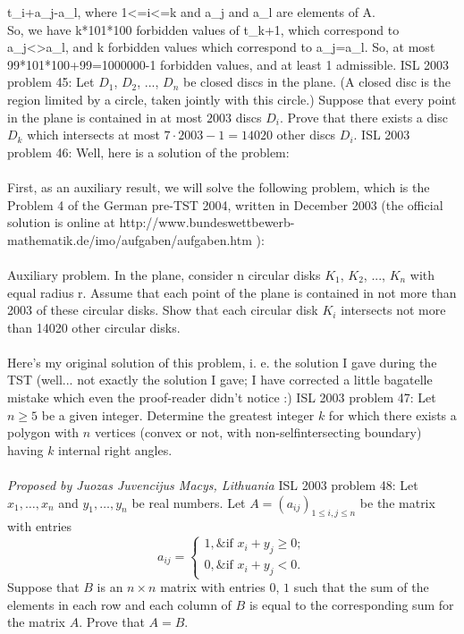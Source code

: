 t_i+a_j-a_l, where 1<=i<=k and a_j and a_l are elements of A. \\
So, we have k*101*100 forbidden values of t_{k+1}, which correspond to a_j<>a_l, and k forbidden values which correspond to a_j=a_l. So, at most 99*101*100+99=1000000-1 forbidden values, and at least 1 admissible. 
ISL 2003 problem 45:  Let $D_1$, $D_2$, ..., $D_n$ be closed discs in the plane. (A closed disc is the region limited by a circle, taken jointly with this circle.) Suppose that every point in the plane is contained in at most $2003$ discs $D_i$. Prove that there exists a disc $D_k$ which intersects at most $7\cdot 2003 - 1 = 14020$ other discs $D_i$. 
ISL 2003 problem 46:  Well, here is a solution of the problem: \\\\
First, as an auxiliary result, we will solve the following problem, which is the Problem 4 of the German pre-TST 2004, written in December 2003 (the official solution is online at http://www.bundeswettbewerb-mathematik.de/imo/aufgaben/aufgaben.htm ): \\\\
Auxiliary problem. In the plane, consider n circular disks $ K_1 $, $ K_2 $, ..., $ K_n $ with equal radius r. Assume that each point of the plane is contained in not more than 2003 of these circular disks. Show that each circular disk $ K_i $ intersects not more than 14020 other circular disks. \\\\
Here's my original solution of this problem, i. e. the solution I gave during the TST (well... not exactly the solution I gave; I have corrected a little bagatelle mistake which even the proof-reader didn't notice :) 
ISL 2003 problem 47:  Let $n \geq 5$ be a given integer.  Determine the greatest integer $k$ for which there exists a polygon with $n$ vertices (convex or not, with non-selfintersecting boundary) having $k$ internal right angles. \\\\
\textit{Proposed by Juozas Juvencijus Macys, Lithuania} 
ISL 2003 problem 48:  Let $x_1,\ldots, x_n$ and $y_1,\ldots, y_n$ be real numbers.  Let $A = (a_{ij})_{1\leq i,j\leq n}$ be the matrix with entries
\[ a_{ij} =
\begin{cases}1,\&\text{if }x_i + y_j\geq 0;\\0,\&\text{if }x_i + y_j < 0.\end{cases}
\]
Suppose that $B$ is an $n\times n$ matrix with entries $0$, $1$ such that the sum of the elements in each row and each column of $B$ is equal to the corresponding sum for the matrix $A$.  Prove that $A=B$. 
